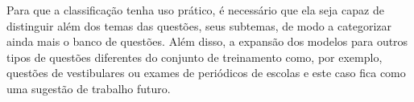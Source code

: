 Para que a classificação tenha uso prático, é necessário que ela seja capaz de distinguir além dos temas das questões, seus subtemas, de modo a categorizar ainda mais o banco de questões. Além disso, a expansão dos modelos para outros tipos de questões diferentes do conjunto de treinamento como, por exemplo, questões de vestibulares ou exames de periódicos de escolas e este caso fica como uma sugestão de trabalho futuro.